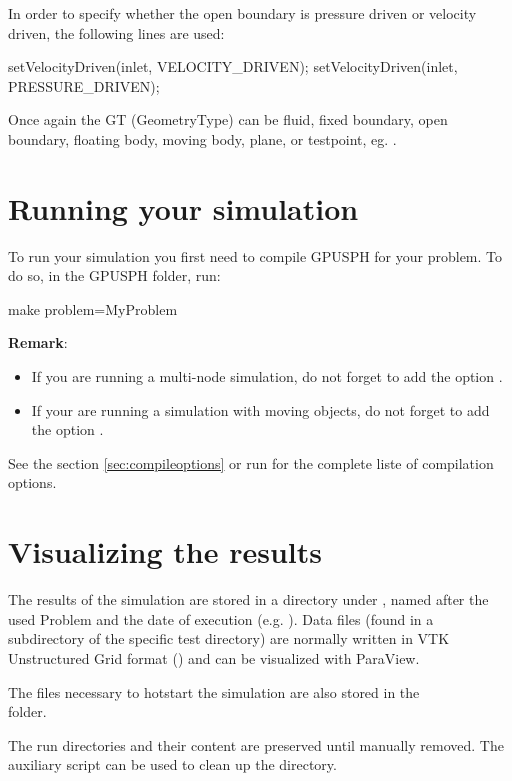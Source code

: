 \documentclass{../GPUSPHtemplate}
\begin{document}
In order to specify whether the open boundary is pressure driven or velocity driven, the following lines
are used:
\begin{shellcode}
setVelocityDriven(inlet, VELOCITY_DRIVEN);
setVelocityDriven(inlet, PRESSURE_DRIVEN);
\end{shellcode}

Once again the GT (GeometryType) can be fluid, fixed boundary, open boundary, 
floating body, moving body, plane, or testpoint, eg. . 

\section{Running your simulation}\label{sec:run}
To run your simulation you first need to compile GPUSPH for your problem.
To do so, in the GPUSPH folder, run:
\begin{shellcode}
make problem=MyProblem
\end{shellcode}
\textbf{Remark}:
\begin{itemize}
\item If you are running a multi-node simulation, do not forget to add the option
.
\item If your are running a simulation with moving objects, do not forget to add the
option .
\end{itemize}
See the section \ref{sec:compileoptions} or run  for the complete liste of compilation options.

\section{Visualizing the results}\label{sec:postprocess}

The results of the simulation are stored in a directory under
, named after the used Problem and the date of execution
(e.g. ). Data files (found in a
 subdirectory of the specific test directory) are normally
written in VTK Unstructured Grid format () and can be
visualized with ParaView.

The files necessary to hotstart the simulation are also stored
in the \\  folder.

The run directories and their content are preserved until manually
removed. The  auxiliary script can be used to clean
up the  directory.
\end{document}
